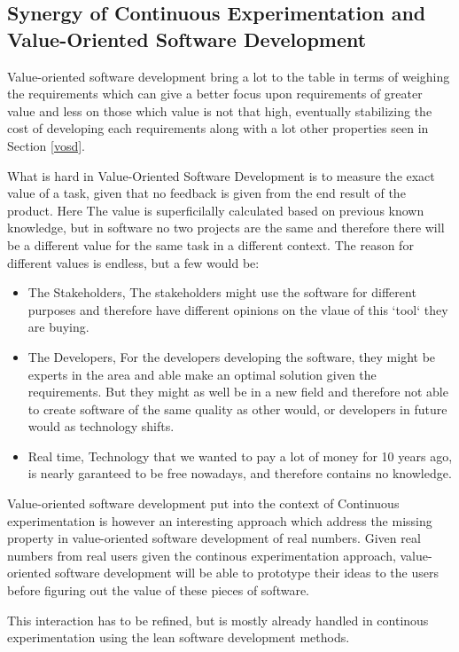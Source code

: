 \documentclass{sig-alternate}
\begin{document}
\subsection{Synergy of Continuous Experimentation  and Value-Oriented Software Development}
Value-oriented software development bring a lot to the table in terms of weighing the requirements 
which can give a better focus upon requirements of greater value and less on those which value is not
that high, eventually stabilizing the cost of developing each requirements along with a lot other properties 
seen in Section \ref{vosd}.

What is hard in Value-Oriented Software Development is to measure the exact value of a task, given that no
feedback is given from the end result of the product.
Here The value is superficilally calculated based on previous known knowledge, but in software no two projects
are the same and therefore there will be a different value for the same task in a different context. 
The reason for different values is endless, but a few would be:
\begin{itemize}
\item The Stakeholders, The stakeholders might use the software for different purposes and therefore have
different opinions on the vlaue of this `tool` they are buying.
\item The Developers, For the developers developing the software, they might be experts in the area and able
make an optimal solution given the requirements. But they might as well be in a new field and therefore 
not able to create software of the same quality as other would, or developers in future would as technology
shifts.
\item Real time, Technology that we wanted to pay a lot of money for 10 years ago, is nearly garanteed to be 
free nowadays, and therefore contains no knowledge.
\end{itemize}

Value-oriented software development put into the context of Continuous experimentation is however an 
interesting approach which address the missing property in value-oriented software development of 
real numbers.
Given real numbers from real users given the continous experimentation approach, value-oriented software 
development will be able to prototype their ideas to the users before figuring out the value of these 
pieces of software.

This interaction has to be refined, but is mostly already handled in continous experimentation using the 
lean software development methods. 
\end{document}
